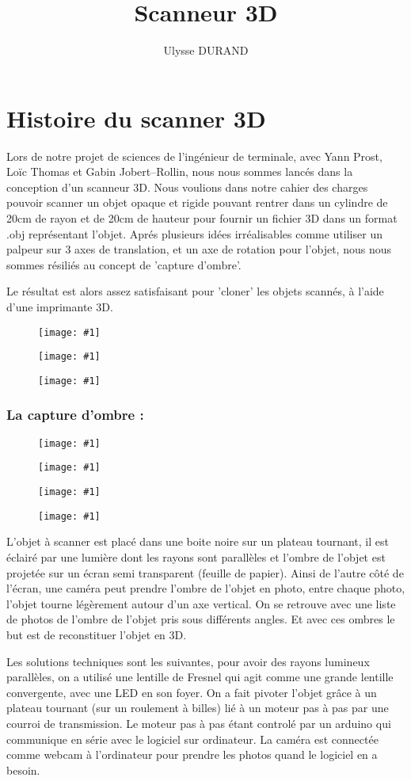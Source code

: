 \documentclass{article}
\newcommand*{\unefiguregraphicsimple}[1]{\begin{figure}[!h] \centering \texttt{[image: \#1]}\end{figure}}
\begin{document}
\title{Scanneur 3D}
\author{Ulysse DURAND}
\date{}
\maketitle

\section*{Histoire du scanner 3D}

Lors de notre projet de sciences de l'ingénieur de terminale, avec
Yann Prost, Loïc Thomas et Gabin Jobert--Rollin, nous nous sommes
lancés dans la conception d'un scanneur 3D. Nous voulions dans notre
cahier des charges pouvoir scanner un objet opaque et rigide pouvant
rentrer dans un cylindre de 20cm de rayon et de 20cm de hauteur pour
fournir un fichier 3D dans un format .obj représentant l'objet. Aprés
plusieurs idées irréalisables comme utiliser un palpeur sur 3 axes
de translation, et un axe de rotation pour l'objet, nous nous sommes
résiliés au concept de 'capture d'ombre'.

Le résultat est alors assez satisfaisant pour 'cloner' les objets
scannés, à l'aide d'une imprimante 3D.

\unefiguregraphicsimple{10}\unefiguregraphicsimple{11}

\unefiguregraphicsimple{12}

\subsubsection*{La capture d'ombre :}

\unefiguregraphicsimple{1}\unefiguregraphicsimple{2}

\unefiguregraphicsimple{3}\unefiguregraphicsimple{4}

L'objet à scanner est placé dans une boite noire sur un plateau tournant,
il est éclairé par une lumière dont les rayons sont parallèles et
l'ombre de l'objet est projetée sur un écran semi transparent (feuille
de papier). Ainsi de l'autre côté de l'écran, une caméra peut prendre
l'ombre de l'objet en photo, entre chaque photo, l'objet tourne légèrement
autour d'un axe vertical. On se retrouve avec une liste de photos
de l'ombre de l'objet pris sous différents angles. Et avec ces ombres
le but est de reconstituer l'objet en 3D.

Les solutions techniques sont les suivantes, pour avoir des rayons
lumineux parallèles, on a utilisé une lentille de Fresnel qui agit
comme une grande lentille convergente, avec une LED en son foyer.
On a fait pivoter l'objet grâce à un plateau tournant (sur un roulement
à billes) lié à un moteur pas à pas par une courroi de transmission.
Le moteur pas à pas étant controlé par un arduino qui communique en
série avec le logiciel sur ordinateur. La caméra est connectée comme
webcam à l'ordinateur pour prendre les photos quand le logiciel en
a besoin.
\end{document}
